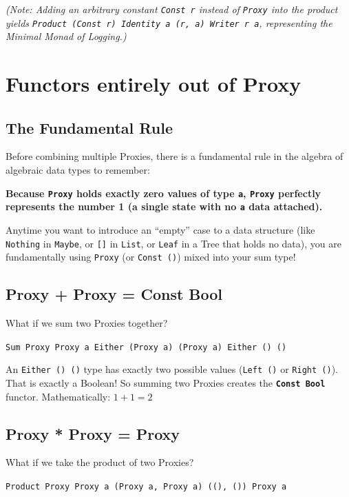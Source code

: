 \documentclass[12pt,a4paper]{article}
\begin{document}
\textit{(Note: Adding an arbitrary constant \texttt{Const r} instead of \texttt{Proxy} into the product yields \texttt{Product (Const r) Identity a \cong (r, a) \cong Writer r a}, representing the Minimal Monad of Logging.)}

\section{Functors entirely out of Proxy}

\subsection{The Fundamental Rule}

Before combining multiple Proxies, there is a fundamental rule in the algebra of algebraic data types to remember:

\textbf{Because \texttt{Proxy} holds exactly zero values of type \texttt{a}, \texttt{Proxy} perfectly represents the number 1 (a single state with no \texttt{a} data attached).}

Anytime you want to introduce an ``empty'' case to a data structure (like \texttt{Nothing} in \texttt{Maybe}, or \texttt{[]} in \texttt{List}, or \texttt{Leaf} in a Tree that holds no data), you are fundamentally using \texttt{Proxy} (or \texttt{Const ()}) mixed into your sum type!

\subsection{Proxy + Proxy = Const Bool}

What if we sum two Proxies together?

\texttt{Sum Proxy Proxy a \cong Either (Proxy a) (Proxy a) \cong Either () ()}

An \texttt{Either () ()} type has exactly two possible values (\texttt{Left ()} or \texttt{Right ()}). That is exactly a Boolean! So summing two Proxies creates the \textbf{\texttt{Const Bool}} functor.
Mathematically: $1 + 1 = 2$

\subsection{Proxy * Proxy = Proxy}

What if we take the product of two Proxies?

\texttt{Product Proxy Proxy a \cong (Proxy a, Proxy a) \cong ((), ()) \cong Proxy a}
\end{document}
